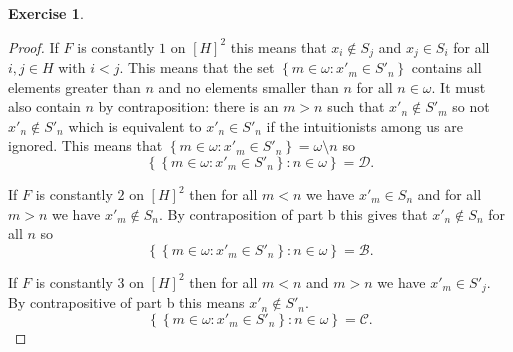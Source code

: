 \documentclass{article}
\theoremstyle{definition}
\newtheorem{question}{Exercise}
\newcommand{\set}[1]{\left\{#1\right\}}
\newcommand{\setwith}[2]{\set{#1\colon#2}}
\begin{document}
\begin{question}
\begin{enumerate}[a.]
\begin{proof}
                  If \(F\) is constantly \(1\) on \([H]^{2}\) this means that
                  \(x_{i}\notin S_{j}\) and \(x_{j}\in S_{i}\) for all \(i,j\in
                  H\) with \(i<j\). This means that the set
                  \(\setwith{m\in\omega}{x'_{m}\in S'_{n}}\) contains all
                  elements greater than \(n\) and no elements smaller than \(n\)
                  for all \(n\in\omega\). It must also contain \(n\) by
                  contraposition: there is an \(m>n\) such that \(x'_{n}\notin
                  S'_{m}\) so not \(x'_{n}\notin S'_{n}\) which is equivalent to
                  \(x'_{n}\in S'_{n}\) if the intuitionists among us are
                  ignored. This means that \(\setwith{m\in\omega}{x'_{m}\in
                  S'_{n}}=\omega\setminus n\) so
                  \[
                      \setwith{\setwith{m\in\omega}{x'_{m}\in S'_{n}}}{n\in\omega}=\mathcal{D}.
                  \]

                  If \(F\) is constantly \(2\) on \([H]^{2}\) then for all
                  \(m<n\) we have \(x'_{m}\in S_{n}\) and for all \(m>n\) we
                  have \(x'_{m}\notin S_{n}\). By contraposition of part b this
                  gives that \(x'_{n}\notin S_{n}\) for all \(n\) so
                  \[
                      \setwith{\setwith{m\in\omega}{x'_{m}\in S'_{n}}}{n\in\omega}=\mathcal{B}.
                  \]

                  If \(F\) is constantly \(3\) on \([H]^{2}\) then for all
                  \(m<n\) and \(m>n\) we have \(x'_{m}\in S'_{j}\). By
                  contrapositive of part b this means \(x'_{n}\notin S'_{n}\).
                  \[
                      \setwith{\setwith{m\in\omega}{x'_{m}\in S'_{n}}}{n\in\omega}=\mathcal{C}.
                  \]
              \end{proof}
    \end{enumerate}
\end{question}
\end{document}
